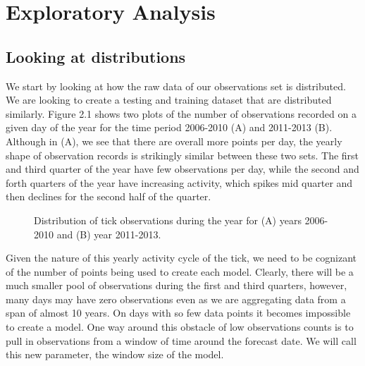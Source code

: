
\chapter{Exploratory Analysis} %

\label{Chapter2} %




\section{Looking at distributions }

We start by looking at how the raw data of our observations set is distributed. We are looking to create a testing and training dataset that are distributed similarly. Figure 2.1 shows two plots of the number of observations recorded on a given day of the year for the time period 2006-2010 (A) and 2011-2013 (B). Although in (A), we see that there are overall more points per day, the yearly shape of observation records is strikingly similar between these two sets. The first and third quarter of the year have few observations per day, while the second and forth quarters of the year have increasing activity, which spikes mid quarter and then declines for the second half of the quarter. 

\begin{figure} [!ht]
\centerline{}
\caption{Distribution of tick observations during the year for (A) years 2006-2010 and (B) year 2011-2013. }
\label{fig6}
\end{figure}


\noindent Given the nature of this yearly activity cycle of the tick, we need to be cognizant of the number of points being used to create each model. Clearly, there will be a much smaller pool of observations during the first and third quarters, however, many days may have zero observations even as we are aggregating data from a span of almost 10 years. On days with so few data points it becomes impossible to create a model. One way around this obstacle of low observations counts is to pull in observations from a window of time around the forecast date. We will call this new parameter, the window size of the model. \newline

